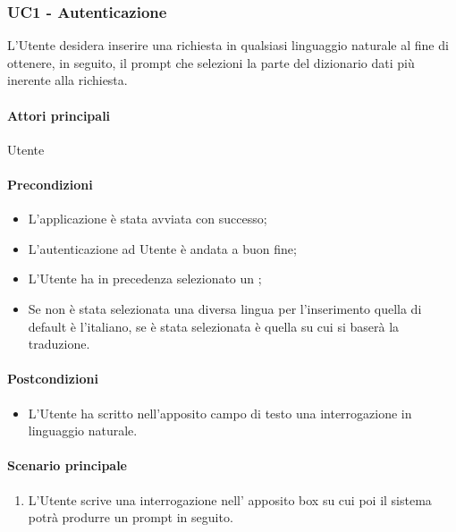 \subsubsection{UC1 - Autenticazione}\label{UC1}
L’Utente desidera inserire una richiesta in qualsiasi linguaggio naturale al fine di ottenere, in seguito, il prompt che selezioni la parte del dizionario dati più inerente alla richiesta.

\paragraph*{Attori principali} Utente

\paragraph*{Precondizioni}
\begin{itemize}
  \item L'applicazione è stata avviata con successo;
  \item L’autenticazione ad Utente è andata a buon fine;
  \item L’Utente ha in precedenza selezionato un ;
  \item Se non è stata selezionata una diversa lingua per l’inserimento quella di default è l’italiano, se è stata selezionata è quella su cui si baserà la traduzione.
\end{itemize}

\paragraph*{Postcondizioni}
\begin{itemize}
  \item L’Utente ha scritto nell’apposito campo di testo una interrogazione in linguaggio naturale.
\end{itemize}

\paragraph*{Scenario principale}
\begin{enumerate}
  \item L’Utente scrive una interrogazione nell’ apposito box su cui poi il sistema potrà produrre un prompt in seguito.
\end{enumerate}


